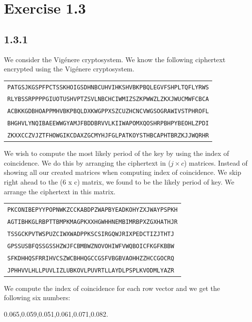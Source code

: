 \documentclass[11pt]{report}
\begin{document}
\newpage

\section*{Exercise 1.3}
\subsection*{1.3.1}
We consider the Vig\'{e}nere cryptosystem. We know the following ciphertext encrypted using the Vig\'{e}nere cryptosystem.
\begin{center}
\begin{tabular}{| l |}
\hline
{\tt PATGSJKGSPFPCTSSKHOIGSDHNBCUHVIHKSHVBKPBQLEGVFSHPLTQFLYRWS}\\
{\tt RLYBSSRPPPPGIUOTUSHVPTZSVLNBCHCIWMIZSZKPWWZLZKXJWUCMWFCBCA}\\
{\tt ACBKKGDBHOAPPMHVBKPBQLDXKWGPPXSZCUZHCNCVWGSOGRAWIVSTPHROFL}\\
{\tt BHGHVLYNQIBAEEWWGYAMJFBDDBRVVLKIIWAPOMXQOSHRPBHPYBEOHLZPDI}\\
{\tt ZKXXCCZVJZTFHOWGIKCDAXZGCMYHJFGLPATKOYSTHBCAPHTBRZKJJWQRHR}\\
\hline
\end{tabular}
\end{center}

We wish to compute the most likely period of the key by using the index of coincidence. We do this by arranging the ciphertext in ($j \times c$) matrices. Instead of showing all our created matrices when computing index of coincidence. We skip right ahead to the (6 x c) matrix, we found to be the likely period of key. We arrange the ciphertext in this matrix.
\begin{center}
\begin{tabular}{| l |}
\hline
{\tt PKCONIBEPYYPOPNWKZCCKABDPZWAPBYEADKOHYZXJWAYPSPKH}\\
{\tt AGTIBHKGLRBPTTBMPKMAGPKXXHGWHHNEMBIMRBPXZGXHATHJR}\\
{\tt TSSGCKPVTWSPUZCIWXWADPPKSCSIRGQWJRIXPEDCTIZJTHTJ}\\
{\tt GPSSUSBFQSSGSSHZWJFCBMBWZNOVOHIWFVWQBOICFKGFKBBW}\\
{\tt SFKDHHQSFRRIHVCSZWCBHHQGCCGSFVBGBVAOHHZZHCCGOCRQ}\\
{\tt JPHHVVLHLLPUVLIZLUBKOVLPUVRTLLAYDLPSPLKVODMLYAZR}\\
\hline
\end{tabular}
\end{center}

We compute the index of coincidence for each row vector and we get the following six numbers:
\begin{center}
0.065,0.059,0.051,0.061,0.071,0.082.
\end{center}
\end{document}
